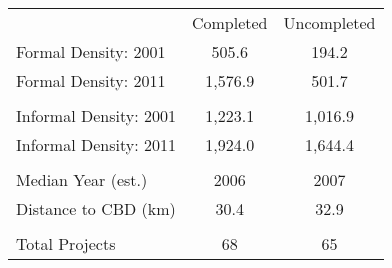 \begin{tabu}{lcc}
 & Completed & Uncompleted \\ 
 Formal Density: 2001  & 505.6  & 194.2  \\ 
 Formal Density: 2011  & 1,576.9  & 501.7  \\ 
 &  &  \\ 
 Informal Density: 2001  & 1,223.1  & 1,016.9  \\ 
 Informal Density: 2011  & 1,924.0  & 1,644.4  \\ 
 &  &  \\ 
 Median Year (est.)  & 2006  & 2007  \\ 
 Distance to CBD (km)  & 30.4  & 32.9  \\ 
 &  &  \\ 
 Total Projects   & 68  & 65  \\ 
\bottomrule
\end{tabu}
